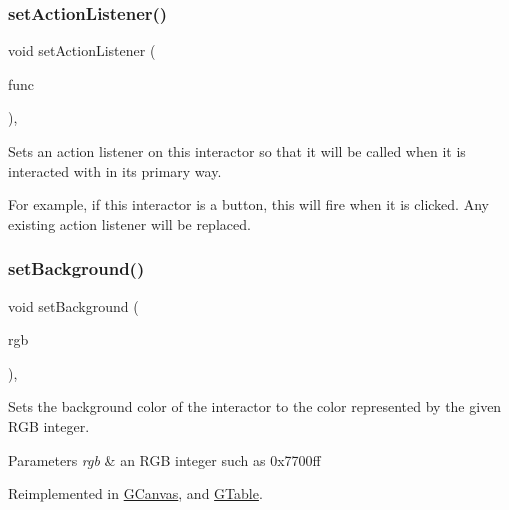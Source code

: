 \subsubsection{\texorpdfstring{set\+Action\+Listener()}{setActionListener()}\hspace{0.1cm}{\footnotesize\ttfamily [2/2]}}
{\footnotesize\ttfamily void set\+Action\+Listener (\begin{DoxyParamCaption}\item[{\mbox{\hyperlink{namespacesgl_a54427ce97bb1c2804e4fe2b0a62e8b17}{G\+Event\+Listener\+Void}}}]{func }\end{DoxyParamCaption})\hspace{0.3cm}{\ttfamily [virtual]}, {\ttfamily [inherited]}}



Sets an action listener on this interactor so that it will be called when it is interacted with in its primary way. 

For example, if this interactor is a button, this will fire when it is clicked. Any existing action listener will be replaced. \mbox{\label{classsgl_1_1GInteractor_acba7e546c2025c0a15ca4b4cc92043db}} 
\subsubsection{\texorpdfstring{set\+Background()}{setBackground()}\hspace{0.1cm}{\footnotesize\ttfamily [1/2]}}
{\footnotesize\ttfamily void set\+Background (\begin{DoxyParamCaption}\item[{int}]{rgb }\end{DoxyParamCaption})\hspace{0.3cm}{\ttfamily [virtual]}, {\ttfamily [inherited]}}



Sets the background color of the interactor to the color represented by the given R\+GB integer. 


\begin{DoxyParams}{Parameters}
{\em rgb} & an R\+GB integer such as 0x7700ff \\
\hline
\end{DoxyParams}


Reimplemented in \mbox{\hyperlink{classsgl_1_1GCanvas_a10d305826534b55561ea88730fc9f6cd}{G\+Canvas}}, and \mbox{\hyperlink{classsgl_1_1GTable_aefbd30fa3e699d49b6dd2c2a2d6e8c2b}{G\+Table}}.

